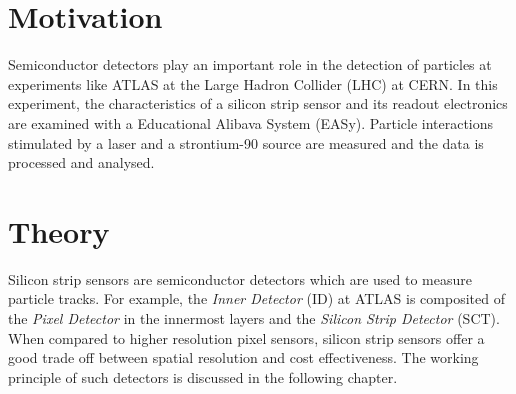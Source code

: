\section{Motivation}
Semiconductor detectors play an important role in the detection of particles at experiments like ATLAS at the Large Hadron Collider (LHC) at CERN. 
In this experiment, the characteristics of a silicon strip sensor and its readout electronics are examined with a Educational Alibava
System (EASy).
Particle interactions stimulated by a laser and a strontium-90 source are measured and the data is processed and analysed.

\section{Theory}
\label{sec:Theory}
Silicon strip sensors are semiconductor detectors which are used to measure particle tracks. For example, the \textit{Inner Detector} (ID) at ATLAS is composited of
the \textit{Pixel Detector} in the innermost layers and the \textit{Silicon Strip Detector} (SCT).
When compared to higher resolution pixel sensors, silicon strip sensors offer a good trade off between spatial resolution and cost effectiveness.  
The working principle of such detectors is discussed in the following chapter.

